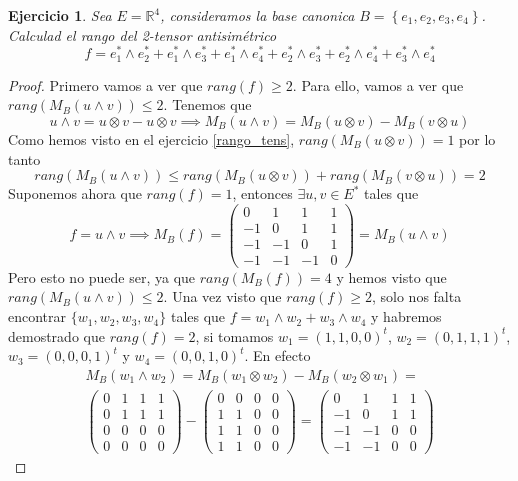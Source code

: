 \documentclass[12pt]{article}
\newcommand{\real}{\mathbb{R}}
\newcommand\setb[1]{\left\{#1\right\}}
\theoremstyle{break}
\newtheorem{ej}{Ejercicio}
\newtheorem*{proof}{Demostración}
\begin{document}
\begin{ej}
	Sea $E = \real^4$, consideramos la base canonica $B = \setb{e_1,e_2,e_3,e_4}$. Calculad
	el rango del 2-tensor antisimétrico
	\[
		f = e_1^* \wedge e_2^* + e_1^* \wedge e_3^* + e_1^* \wedge e_4^* + e_2^* \wedge e_3^*
		+ e_2^* \wedge e_4^* + e_3^* \wedge e_4^*
	\]
\end{ej}
\begin{proof}
	Primero vamos a ver que $rang(f) \geq 2$. Para ello, vamos a ver que
	$rang(M_B(u \wedge v)) \leq 2$. Tenemos que
	\[
		u \wedge v = u \otimes v - u \otimes v \implies M_B(u\wedge v) = M_B(u \otimes v)
		- M_B(v \otimes u)
	\]
	Como hemos visto en el ejercicio \ref{rango_tens}, $rang(M_B(u \otimes v)) =1$ por lo
	tanto
	\[
		rang(M_B(u \wedge v)) \leq rang(M_B(u \otimes v)) + rang(M_B(v \otimes u)) = 2
	\]
	Suponemos ahora que $rang(f)= 1$, entonces $\exists u,v \in E^*$ tales que
	\[
		f = u \wedge v \implies M_B(f) = \begin{pmatrix}
		0 & 1 & 1 & 1 \\ -1 & 0 & 1 & 1 \\ -1 & -1 & 0 & 1 \\ -1 & -1 & -1 & 0
		\end{pmatrix} = M_B(u \wedge v)
	\]
	Pero esto no puede ser, ya que $rang(M_B(f))=4$ y hemos visto que
	$rang(M_B(u \wedge v)) \leq 2$. Una vez visto que $rang(f) \geq 2$, solo nos falta
	encontrar $\{w_1,w_2,w_3,w_4\}$ tales que $f = w_1\wedge w_2 + w_3 \wedge w_4$ y habremos
	demostrado que $rang(f) = 2$, si tomamos $w_1 = (1,1,0,0)^t$, $w_2=(0,1,1,1)^t$,
	$w_3 = (0,0,0,1)^t$ y $w_4 = (0,0,1,0)^t$. En efecto
	\begin{gather*}
		M_B(w_1 \wedge w_2) = M_B(w_1 \otimes w_2) - M_B(w_2 \otimes w_1)= \\ \begin{pmatrix}
			0 & 1 & 1 & 1 \\ 0 & 1 & 1 & 1 \\ 0 & 0 & 0 & 0 \\ 0 & 0 & 0 & 0
		\end{pmatrix} - \begin{pmatrix}
			0 & 0 & 0 & 0 \\ 1 & 1 & 0 & 0 \\ 1 & 1 & 0 & 0 \\ 1 & 1 & 0 & 0
		\end{pmatrix} = \begin{pmatrix}
			0 & 1 & 1 & 1 \\ -1 & 0 & 1 & 1 \\ -1 & -1 & 0 & 0 \\ -1 & -1 & 0 & 0

\end{pmatrix}
\end{gather*}
\end{proof}
\end{document}
